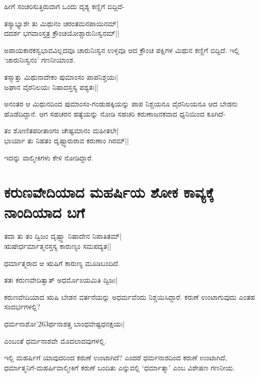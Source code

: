 ಹೀಗೆ ಸಂಚರಿಸುತ್ತಿರುವಾಗ ಒಂದು ದೃಶ್ಯ ಕಣ್ಣಿಗೆ ಬಿದ್ದಿದೆ- 

\begin{shloka} 
ತಸ್ಯಾಭ್ಯಾಶೇ ತು ಮಿಥುನಂ ಚರಂತಮನಪಾಯಿನಮ್‍|\label{198a}\\ 
ದದರ್ಶ ಭಗವಾಂಸ್ತತ್ರ ಕ್ರೌಂಚಯೋಶ್ಚಾರುನಿಃಸ್ವನಮ್‍||
\end{shloka}

ಅಪಾಯಕಾರಕಸ್ವಭಾವವಿಲ್ಲದವೂ ಚಾರುನಿಃಸ್ವನ ಉಳ್ಳವೂ ಆದ ಕ್ರೌಂಚ ಪಕ್ಷಿಗಳ ಮಿಥುನ ಕಣ್ಣಿಗೆ ಬಿದ್ದಿದೆ. ಇಲ್ಲಿ `ಚಾರುನಿಃಸ್ವನಂ' ಗಣನೀಯಾಂಶ. 

\begin{shloka}
ತಸ್ಮಾತ್ತು ಮಿಥುನಾದೇಕಂ ಪುಮಾಂಸಂ ಪಾಪನಿಶ್ಚಯಃ|\label{198d}\\ 
ಜಘಾನ ವೈರನಿಲಯಃ ನಿಷಾದಸ್ತಸ್ಯ ಪಶ್ಯತಃ||
\end{shloka}

ಅನಂತರ ಆ ಮಿಥುನದಿಂದ ಪುಮಾಂಸಂ-ಗಂಡುಹಕ್ಕಿಯನ್ನು ಪಾಪ ನಿಶ್ಚಯನೂ ವೈರನಿಲಯನೂ ಆದ ಬೇಡನು ಹೊಡೆದಿದ್ದಾನೆ. ಆಗ ಸಹಚರನ ಹತ್ಯೆಯನ್ನು ನೋಡಿ ಸಹಚರಿ ಕರುಣಾಜನಕವಾದ ಧ್ವನಿಯಿಂದ ಕೂಗಿದೆ- 

\begin{shloka}
ತಂ ಶೋಣಿತಪರೀತಾಂಗಂ ಚೇಷ್ಟಮಾನಂ ಮಹೀತಲೇ|\label{198c}\\ 
ಭಾರ್ಯಾ ತು ನಿಹತಂ ದೃಷ್ಟ್ವಾರುರಾವ ಕರುಣಾಂ ಗಿರಮ್‍||
\end{shloka}

ಇದನ್ನು ವಾಲ್ಮೀಕಿಗಳು ಕೇಳಿ ನೋಡಿದ್ದಾರೆ. 

\section*{ಕರುಣವೇದಿಯಾದ ಮಹರ್ಷಿಯ ಶೋಕ ಕಾವ್ಯಕ್ಕೆ ನಾಂದಿಯಾದ ಬಗೆ} 

\begin{shloka} 
ತದಾ ತು ತಂ ದ್ವಿಜಂ ದೃಷ್ಟ್ವಾ ನಿಷಾದೇನ ನಿಪಾತಿತಮ್‍|\label{199}\\ 
ಋಷೇರ್ಧರ್ಮಾತ್ಮನಸ್ತಸ್ಯ ಕಾರುಣ್ಯಂ ಸಮಪದ್ಯತ|| 
\end{shloka}

ಧರ್ಮಾತ್ಮರಾದ ಆ ಋಷಿಗೆ ಕಾರುಣ್ಯ ಮೂಡಿಬಂದಿದೆ. 

\begin{shloka} 
ತತಃ ಕರುಣವೇದಿತ್ವಾತ್‍ ಅಧರ್ಮೊಽಯಮಿತಿ ದ್ವಿಜಃ| 
\end{shloka}

ಕರುಣವೇದಿಯಾದ ಋಷಿ ಬೇಡನ ವರ್ತನೆಯನ್ನು ಅಧರ್ಮವೆಂದು ನಿಶ್ಚಯಿಸಿದ್ದಾರೆ. ಕರುಣೆ ಉಂಟಾಗುವುದು ಎಂತಹ ಸಂದರ್ಭಗಳಲ್ಲಿ? 

\begin{shloka}
ಧರ್ಮನಾಶೋ\char'263ರ್ಥನಾಶತ್ಚ ಬಾಂಧವೇಷ್ಟಧನಕ್ಷಯಃ|\label{199a}
\end{shloka}
ಎಂಬಂತೆ ಧರ್ಮನಾಶವೇ ಮೊದಲಾದವುಗಳಲ್ಲಿ. 

ಇಲ್ಲಿ ಮಹರ್ಷಿಗೆ ಯಾವುದರಿಂದ ಕರುಣೆ ಉಂಟಾಗಿದೆ? ಎಂದರೆ ಧರ್ಮನಾಶದಿಂದ ಕರುಣೆ ಉಂಟಾಗಿದೆ, ಧರ್ಮಾತ್ಮನಿಗೆ-ಮಹರ್ಷಿವಾಲ್ಮೀಕಿಗೆ ಕರುಣೆ ಬಂದಿತು ಎನ್ನುವಲ್ಲಿ `ಧರ್ಮಾತ್ಮಾ' ಎಂಬ ವಿಶೇಷಣ ಗಣನೀಯ. 

